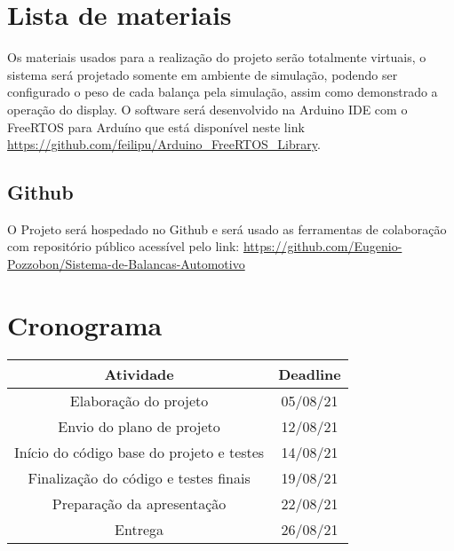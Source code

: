 \documentclass[a4paper, 12pt]{article}
\begin{document}
	\section{Lista de materiais}
	Os materiais usados para a realização do projeto serão totalmente virtuais, o sistema será projetado somente em ambiente de simulação, podendo ser configurado o peso de cada balança pela simulação, assim como demonstrado a operação do display. O software será desenvolvido na Arduino IDE com o FreeRTOS para Arduíno que está disponível neste link \url{https://github.com/feilipu/Arduino_FreeRTOS_Library}.
	
	\subsection{Github}
	O Projeto será hospedado no Github e será usado as ferramentas de colaboração com repositório público acessível pelo link: \url{https://github.com/Eugenio-Pozzobon/Sistema-de-Balancas-Automotivo}
	
	\section{Cronograma}
	\begin{table}[htb]
		\centering
		\begin{tabular}{c|c}
			Atividade & Deadline \\ \hline
			Elaboração do projeto & 05/08/21 \\ \hline
			Envio do plano de projeto & 12/08/21 \\ \hline
			Início do código base do projeto e testes & 14/08/21 \\ \hline
			Finalização do código e testes finais & 19/08/21 \\ \hline
			Preparação da apresentação & 22/08/21 \\ \hline
			Entrega	& 26/08/21\\
		\end{tabular}
	\end{table}
	
	
\end{document}
